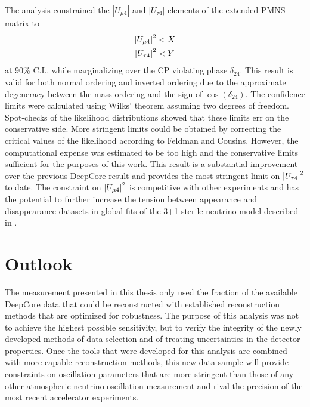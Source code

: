 The analysis constrained the $|U_{\mu4}|$ and $|U_{\tau4}|$ elements of the extended PMNS matrix to
\begin{equation}
    \begin{aligned}
        \abs{U_{\mu4}}^2 &< X \\
        \abs{U_{\tau4}}^2 &< Y \\
    \end{aligned}
\end{equation}
at 90\% C.L. while marginalizing over the CP violating phase $\delta_{24}$. This result is valid for both normal ordering and inverted ordering due to the approximate degeneracy between the mass ordering and the sign of $\cos(\delta_{24})$. The confidence limits were calculated using Wilks' theorem assuming two degrees of freedom. Spot-checks of the likelihood distributions showed that these limits err on the conservative side. More stringent limits could be obtained by correcting the critical values of the likelihood according to Feldman and Cousins\cite{Feldman_1998}. However, the computational expense was estimated to be too high and the conservative limits sufficient for the purposes of this work. This result is a substantial improvement over the previous DeepCore result and provides the most stringent limit on $\abs{U_{\tau4}}^2$ to date. The constraint on $\abs{U_{\mu4}}^2$ is competitive with other experiments and has the potential to further increase the tension between appearance and disappearance datasets in global fits of the 3+1 sterile neutrino model described in .

\section{Outlook}

The measurement presented in this thesis only used the fraction of the available DeepCore data that could be reconstructed with established reconstruction methods that are optimized for robustness.
The purpose of this analysis was not to achieve the highest possible sensitivity, but to verify the integrity of the newly developed methods of data selection and of treating uncertainties in the detector properties.
Once the tools that were developed for this analysis are combined with more capable reconstruction methods, this new data sample will provide constraints on oscillation parameters that are more stringent than those of any other atmospheric neutrino oscillation measurement and rival the precision of the most recent accelerator experiments.

